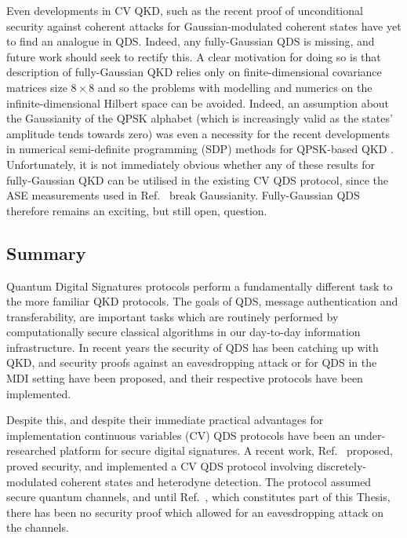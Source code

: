 Even developments in CV QKD, such as the recent proof of unconditional security against coherent attacks for Gaussian-modulated coherent states \cite{Leverrier2017} have yet to find an analogue in QDS. Indeed, any fully-Gaussian QDS is missing, and future work should seek to rectify this. A clear motivation for doing so is that description of fully-Gaussian QKD relies only on finite-dimensional covariance matrices size $8 \times 8$ \cite{Laudenbach2017} and so the problems with modelling and numerics on the infinite-dimensional Hilbert space can be avoided. Indeed, an assumption about the Gaussianity of the QPSK alphabet (which is increasingly valid as the states' amplitude tends towards zero) was even a necessity for the recent developments in numerical semi-definite programming (SDP) methods for QPSK-based QKD \cite{Lin2019, Ghorai2019}. Unfortunately, it is not immediately obvious whether any of these results for fully-Gaussian QKD can be utilised in the existing CV QDS protocol, since the ASE measurements used in Ref.~\cite{Croal2016} break Gaussianity. Fully-Gaussian QDS therefore remains an exciting, but still open, question.


\subsection{Summary}
Quantum Digital Signatures protocols perform a fundamentally different task to the more familiar QKD protocols. The goals of QDS, message authentication and transferability, are important tasks which are routinely performed by computationally secure classical algorithms in our day-to-day information infrastructure. In recent years the security of QDS has been catching up with QKD, and security proofs against an eavesdropping attack \cite{Amiri2016, Yin2106} or for QDS in the MDI setting \cite{Puthoor2016} have been proposed, and their respective protocols have been implemented. 

Despite this, and despite their immediate practical advantages for implementation continuous variables (CV) QDS protocols have been an under-researched platform for secure digital signatures.  A recent work, Ref.~\cite{Croal2016} proposed, proved security, and implemented a CV QDS protocol involving discretely-modulated coherent states and heterodyne detection. The protocol assumed secure quantum channels, and until Ref.~\cite{Thornton2019}, which constitutes part of this Thesis, there has been no security proof which allowed for an eavesdropping attack on the channels.

